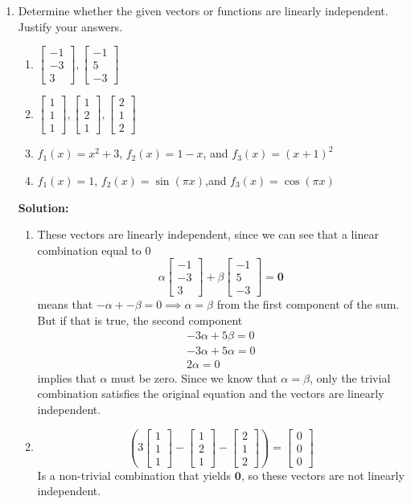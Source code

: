 \documentclass[]{article}
\newcommand{\bbm}{\begin{bmatrix}}		%
\newcommand{\ebm}{\end{bmatrix}}		%
\newcommand{\solution}{\vskip 0.5cm \textbf{\large Solution:} \\}
\begin{document}
    \begin{enumerate}[resume]
	\item Determine whether the given vectors or functions are linearly independent. Justify your answers.
	  \begin{enumerate}
	  \item $\bbm -1\\-3\\3 \ebm, \bbm -1\\5\\-3 \ebm$
	  \item $\bbm 1\\1\\1 \ebm, \bbm 1\\2\\1 \ebm, \bbm 2\\1\\2 \ebm$
	  \item $f_1(x)=x^2+3$, $f_2(x) = 1-x$, and $f_3(x) = (x+1)^2$
	  \item $f_1(x)=1$, $f_2(x)=\sin(\pi x)$,and $f_3(x)=\cos(\pi x)$

	  \end{enumerate}

	  \solution
	  \begin{enumerate}
	  \item These vectors are linearly independent, since we can see
        that a linear combination equal to 0
        \[
        \alpha \bbm -1\\-3\\3 \ebm +  \beta \bbm -1\\5\\-3 \ebm = \bm{0}
        \]
        means that $-\alpha + -\beta = 0 \implies \alpha = \beta$ from
        the first component of the sum. But if that is true, the second
        component
        \begin{gather*}
          -3\alpha + 5\beta = 0 \\
          -3\alpha + 5\alpha = 0 \\
          2\alpha = 0
        \end{gather*}
        implies that $\alpha$ must be zero. Since we know that $\alpha =
        \beta$, only the trivial combination satisfies the original
        equation and the vectors are linearly independent.

        
	  \item
        \[
        \left(3\bbm 1\\1\\1 \ebm - \bbm 1\\2\\1 \ebm - \bbm 2\\1\\2
        \ebm\right) = \bbm 0\\0\\0 \ebm
        \]
        Is a non-trivial combination that yields $\bm{0}$, so these vectors are not linearly
        independent.


\end{enumerate}
\end{enumerate}
\end{document}
